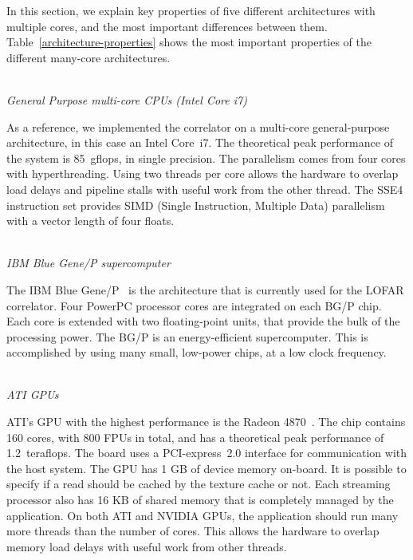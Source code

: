 \documentclass{article}
\begin{document}
In this section, we explain key properties of five different
architectures with multiple cores, and the most important differences between them. 
Table~\ref{architecture-properties}
shows the most important properties of the different many-core
architectures. 


\noindent \\ \emph{General Purpose multi-core CPUs (Intel Core i7)}

\noindent As a reference, we implemented the correlator on a multi-core
general-purpose architecture, in this case an Intel Core~i7.  The
theoretical peak performance of the system is 85~gflops, in single
precision.  The parallelism comes from four cores with 
hyperthreading.
Using two threads per core allows the hardware to overlap
load delays and pipeline stalls with useful work from the other thread.
The SSE4 instruction set provides SIMD (Single Instruction, Multiple Data) parallelism with a vector length of four floats.


\noindent \\ \emph{IBM Blue Gene/P supercomputer}

\noindent The IBM Blue Gene/P~\cite{IBM:08} is the architecture that is
currently used for the LOFAR correlator.
Four PowerPC processor cores are integrated on each BG/P chip.
Each core is extended with two floating-point units, that provide the bulk of the processing power.
The BG/P is an energy-efficient supercomputer.
This is accomplished by using many small, low-power chips, at a low clock
frequency.


\noindent \\ \emph{ATI GPUs}

\noindent ATI's GPU with the highest performance is
the Radeon 4870~\cite{amd-manual}.  The chip contains 160 cores, with 800 FPUs in total, 
and has a theoretical peak performance of
1.2~teraflops. The board uses a PCI-express~2.0 interface
for communication with the host system.
The GPU has 1 GB of device memory on-board.
It is possible to specify if a read should be
cached by the texture cache or not.
Each streaming processor also has 16 KB of shared
memory that is completely managed by the application. 
On both ATI and NVIDIA GPUs, the application should run many more threads
than the number of cores. This allows the hardware to overlap memory load delays with useful
work from other threads.
\end{document}
